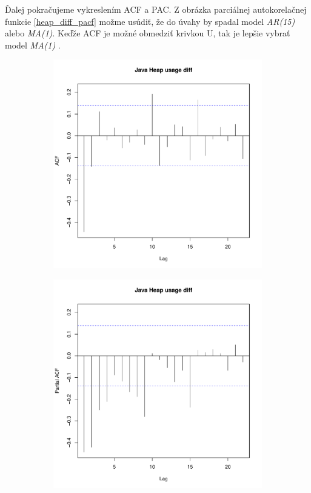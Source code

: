 \documentclass[12pt,a4paper,oneside,final]{article}
\theoremstyle{definition}
\theoremstyle{remark}
\numberwithin{equation}{section}
\begin{document}
Ďalej pokračujeme vykreslením ACF a PAC. Z obrázka parciálnej autokorelačnej funkcie \ref{heap_diff_pacf} 
možme usúdiť, že do úvahy by spadal model \emph{AR(15)} alebo \emph{MA(1)}. Keďže ACF je
možné obmedziť krivkou U, tak je lepšie vybrať model \emph{MA(1)} \cite{cipra}.
\begin{figure}[!tbo] \centering
    \begin{subfigure}[b]{0.45\textwidth}
        \centering
        \includegraphics[width=1\linewidth]{images/heap_diff_acf.pdf}
        \label{obr:heap_diff_acf}
    \end{subfigure}
    \begin{subfigure}[b]{0.45\textwidth}
        \centering
        \includegraphics[width=1\linewidth]{images/heap_diff_pacf.pdf}

\end{subfigure}
\end{figure}
\end{document}
